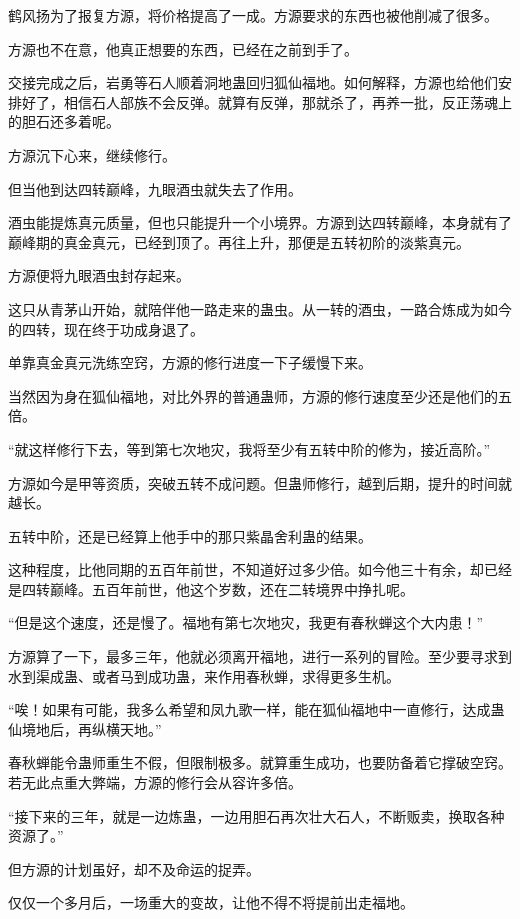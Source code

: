 \begin{this_body}
鹤风扬为了报复方源，将价格提高了一成。方源要求的东西也被他削减了很多。

方源也不在意，他真正想要的东西，已经在之前到手了。

交接完成之后，岩勇等石人顺着洞地蛊回归狐仙福地。如何解释，方源也给他们安排好了，相信石人部族不会反弹。就算有反弹，那就杀了，再养一批，反正荡魂上的胆石还多着呢。

方源沉下心来，继续修行。

但当他到达四转巅峰，九眼酒虫就失去了作用。

酒虫能提炼真元质量，但也只能提升一个小境界。方源到达四转巅峰，本身就有了巅峰期的真金真元，已经到顶了。再往上升，那便是五转初阶的淡紫真元。

方源便将九眼酒虫封存起来。

这只从青茅山开始，就陪伴他一路走来的蛊虫。从一转的酒虫，一路合炼成为如今的四转，现在终于功成身退了。

单靠真金真元洗练空窍，方源的修行进度一下子缓慢下来。

当然因为身在狐仙福地，对比外界的普通蛊师，方源的修行速度至少还是他们的五倍。

“就这样修行下去，等到第七次地灾，我将至少有五转中阶的修为，接近高阶。”

方源如今是甲等资质，突破五转不成问题。但蛊师修行，越到后期，提升的时间就越长。

五转中阶，还是已经算上他手中的那只紫晶舍利蛊的结果。

这种程度，比他同期的五百年前世，不知道好过多少倍。如今他三十有余，却已经是四转巅峰。五百年前世，他这个岁数，还在二转境界中挣扎呢。

“但是这个速度，还是慢了。福地有第七次地灾，我更有春秋蝉这个大内患！”

方源算了一下，最多三年，他就必须离开福地，进行一系列的冒险。至少要寻求到水到渠成蛊、或者马到成功蛊，来作用春秋蝉，求得更多生机。

“唉！如果有可能，我多么希望和凤九歌一样，能在狐仙福地中一直修行，达成蛊仙境地后，再纵横天地。”

春秋蝉能令蛊师重生不假，但限制极多。就算重生成功，也要防备着它撑破空窍。若无此点重大弊端，方源的修行会从容许多倍。

“接下来的三年，就是一边炼蛊，一边用胆石再次壮大石人，不断贩卖，换取各种资源了。”

但方源的计划虽好，却不及命运的捉弄。

仅仅一个多月后，一场重大的变故，让他不得不将提前出走福地。

\end{this_body}

